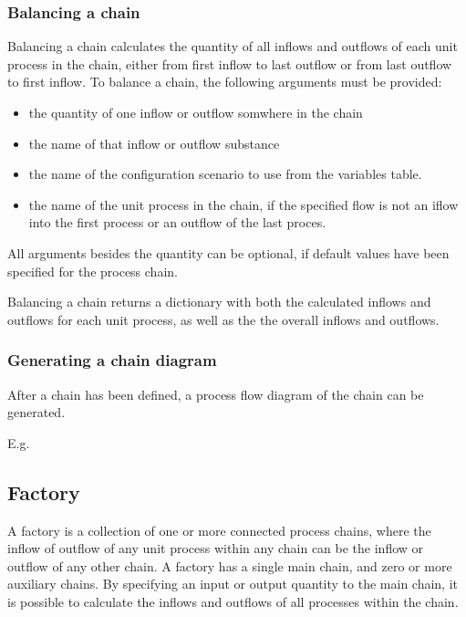\documentclass[a4paper,10pt,english]{sphinxmanual}
\begin{document}
\subsubsection{Balancing a chain}
\label{\detokenize{intro:balancing-a-chain}}
Balancing a chain calculates the quantity of all inflows and outflows of each unit process in the chain, either from first inflow to last outflow or from last outflow to first inflow. To balance a chain, the following arguments  must be provided:
\begin{itemize}
\item {} 
the quantity of one inflow or outflow somwhere in the chain

\item {} 
the name of that inflow or outflow substance

\item {} 
the name of the configuration scenario to use from the variables table.

\item {} 
the name of the unit process in the chain, if the specified flow is not an iflow into the first process or an outflow of the last proces.

\end{itemize}

All arguments besides the quantity can be optional, if default values have been specified for the process chain.

Balancing a chain returns a dictionary with both the calculated inflows and outflows for each unit process, as well as the the overall inflows and outflows.


\subsubsection{Generating a chain diagram}
\label{\detokenize{intro:generating-a-chain-diagram}}
After a chain has been defined, a process flow diagram of the chain can be generated.

E.g.



\subsection{Factory}
\label{\detokenize{intro:factory}}
A factory is a collection of one or more connected process chains, where the inflow of outflow of any unit process within any chain can be the inflow or outflow of any other chain. A factory has a single main chain, and zero or more auxiliary chains. By specifying an input or output quantity to the main chain, it is possible to calculate the inflows and outflows of all processes within the chain.
\end{document}

